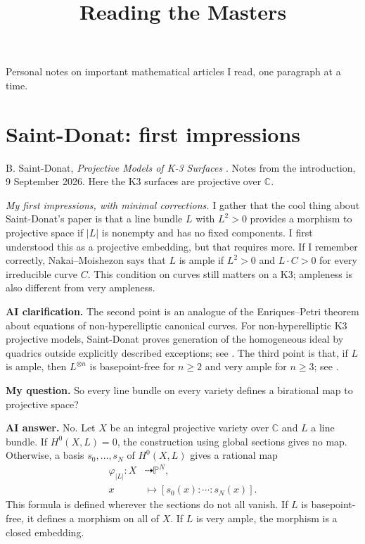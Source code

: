 



\title{Reading the Masters}
\maketitle

\label{section-phantom}

\noindent
Personal notes on important mathematical
articles I read, one paragraph at a time.

\medskip
\tableofcontents

\section{Saint-Donat: first impressions}
\label{section-saint-donat}

\noindent
B. Saint-Donat, \textit{Projective Models
of K-3 Surfaces} \cite{saint-donat}.
Notes from the introduction, 9 September
2026. Here the K3 surfaces are projective
over $\mathbb{C}$.

\medskip\noindent
\textit{My first impressions, with minimal
corrections.}
I gather that the cool thing about
Saint-Donat's paper is that a line bundle
$L$ with $L^2>0$ provides a morphism to
projective space if $|L|$ is nonempty and
has no fixed components. I first understood
this as a projective embedding, but that
requires more. If I remember correctly,
Nakai--Moishezon says that $L$ is ample if
$L^2>0$ and $L\cdot C>0$ for every
irreducible curve $C$. This condition on
curves still matters on a K3; ampleness is
also different from very ampleness.


\medskip\noindent
\textbf{AI clarification.}
The second point is an analogue of the
Enriques--Petri theorem about equations of
non-hyperelliptic canonical curves. For
non-hyperelliptic K3 projective models,
Saint-Donat proves
generation of the homogeneous ideal by
quadrics outside explicitly described
exceptions; see
\cite[Theorem 7.2]{saint-donat}.
The third point is that, if $L$ is ample,
then $L^{\otimes n}$ is basepoint-free for
$n\geq 2$ and very ample for $n\geq 3$;
see \cite[Theorem 8.3]{saint-donat}.

\medskip\noindent
\textbf{My question.}
So every line bundle on every variety
defines a birational map to projective
space?

\medskip\noindent
\textbf{AI answer.}
No. Let $X$ be an integral projective
variety over $\mathbb{C}$ and $L$ a line
bundle. If $H^0(X,L)=0$, the construction
using global sections gives no map.
Otherwise, a basis $s_0,\ldots,s_N$ of
$H^0(X,L)$ gives a rational map
$$
\begin{aligned}
\varphi_{|L|}:X
&\dashrightarrow\mathbb{P}^N,\\
x&\longmapsto[s_0(x):\cdots:s_N(x)].
\end{aligned}
$$
This formula is defined wherever the
sections do not all vanish. If $L$ is
basepoint-free, it defines a morphism on
all of $X$. If $L$ is very ample, the
morphism is a closed embedding.

